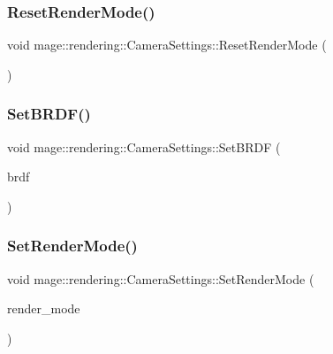 \hypertarget{classmage_1_1rendering_1_1_camera_settings_a1f8e364760855a786743890f0eb22e96}{}\label{classmage_1_1rendering_1_1_camera_settings_a1f8e364760855a786743890f0eb22e96} 
\subsubsection{\texorpdfstring{Reset\+Render\+Mode()}{ResetRenderMode()}}
{\footnotesize\ttfamily void mage\+::rendering\+::\+Camera\+Settings\+::\+Reset\+Render\+Mode (\begin{DoxyParamCaption}{ }\end{DoxyParamCaption})\hspace{0.3cm}{\ttfamily [noexcept]}}

\hypertarget{classmage_1_1rendering_1_1_camera_settings_ab764e8cf2295c635d842df609a87a7f1}{}\label{classmage_1_1rendering_1_1_camera_settings_ab764e8cf2295c635d842df609a87a7f1} 
\subsubsection{\texorpdfstring{Set\+B\+R\+D\+F()}{SetBRDF()}}
{\footnotesize\ttfamily void mage\+::rendering\+::\+Camera\+Settings\+::\+Set\+B\+R\+DF (\begin{DoxyParamCaption}\item[{\hyperlink{namespacemage_1_1rendering_a13c5e70586af4ce254146074ec055bf6}{B\+R\+D\+F\+Type}}]{brdf }\end{DoxyParamCaption})\hspace{0.3cm}{\ttfamily [noexcept]}}

\hypertarget{classmage_1_1rendering_1_1_camera_settings_aa4f29b081141c0acfb0e4d92eac81602}{}\label{classmage_1_1rendering_1_1_camera_settings_aa4f29b081141c0acfb0e4d92eac81602} 
\subsubsection{\texorpdfstring{Set\+Render\+Mode()}{SetRenderMode()}}
{\footnotesize\ttfamily void mage\+::rendering\+::\+Camera\+Settings\+::\+Set\+Render\+Mode (\begin{DoxyParamCaption}\item[{\hyperlink{namespacemage_1_1rendering_aeb14ce7610cc9391f4e01be027b91dcc}{Render\+Mode}}]{render\+\_\+mode }\end{DoxyParamCaption})\hspace{0.3cm}{\ttfamily [noexcept]}}

